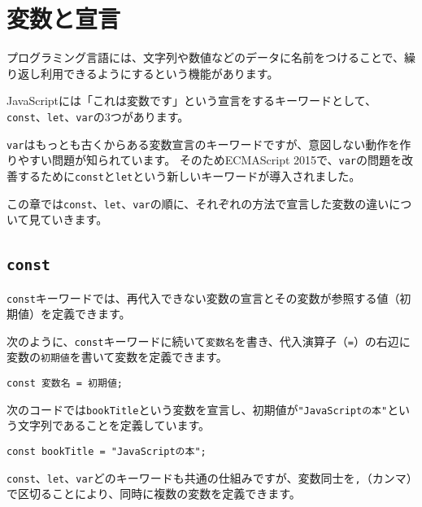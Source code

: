 \hypertarget{variable-and-declaration}{%
\chapter{変数と宣言}\label{variable-and-declaration}}
\thispagestyle{frontheadings}

プログラミング言語には、文字列や数値などのデータに名前をつけることで、繰り返し利用できるようにする\textbf{}という機能があります。

JavaScriptには「これは変数です」という宣言をするキーワードとして、
\texttt{const}、\texttt{let}、\texttt{var}の3つがあります。

\texttt{var}はもっとも古くからある変数宣言のキーワードですが、意図しない動作を作りやすい問題が知られています。
そのためECMAScript
2015で、\texttt{var}の問題を改善するために\texttt{const}と\texttt{let}という新しいキーワードが導入されました。

この章では\texttt{const}、\texttt{let}、\texttt{var}の順に、それぞれの方法で宣言した変数の違いについて見ていきます。

\hypertarget{const}{%
\section[\texttt{const}]{\texttt{const}\,\protect{}}\label{const}}

\texttt{const}キーワードでは、再代入できない変数の宣言とその変数が参照する値（初期値）を定義できます。

次のように、\texttt{const}キーワードに続いて\texttt{変数名}を書き、代入演算子（\texttt{=}）の右辺に変数の\texttt{初期値}を書いて変数を定義できます。

\begin{lstlisting}
const 変数名 = 初期値;
\end{lstlisting}

次のコードでは\texttt{bookTitle}という変数を宣言し、初期値が\texttt{"JavaScriptの本"}という文字列であることを定義しています。

\begin{lstlisting}
const bookTitle = "JavaScriptの本";
\end{lstlisting}

\texttt{const}、\texttt{let}、\texttt{var}どのキーワードも共通の仕組みですが、変数同士を\texttt{,}（カンマ）で区切ることにより、同時に複数の変数を定義できます。

